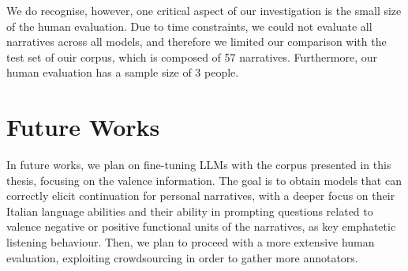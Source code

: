 We do recognise, however, one critical aspect of our investigation is the small size of the human evaluation. Due to time constraints, we could not evaluate all narratives across all models, and therefore we limited our comparison with the test set of ouir corpus, which is composed of 57 narratives. Furthermore, our human evaluation has a sample size of 3 people. 

\section{Future Works}
In future works, we plan on fine-tuning LLMs with the corpus presented in this thesis, focusing on the valence information. The goal is to obtain models that can correctly elicit continuation for personal narratives, with a deeper focus on their Italian language abilities and their ability in prompting questions related to valence negative or positive functional units of the narratives, as key emphatetic listening behaviour. Then, we plan to proceed with a more extensive human evaluation, exploiting crowdsourcing in order to gather more annotators. 